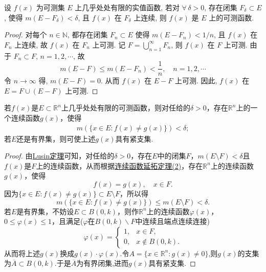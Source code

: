 \documentclass[../../main.tex]{subfiles}
\begin{document}
\begin{theorem}\label{theorem:Lusin定理的逆定理}
设 \( f(x) \) 为可测集 \( E \) 上几乎处处有限的实值函数, 若对 \( \forall\,\delta > 0 \), 存在闭集 \( F_{\delta} \subset E \), 使得 \( m(E - F_{\delta}) < \delta \), 且 \( f(x) \) 在 \( F_{\delta} \) 上连续, 则 \( f(x) \) 是 \( E \) 上的可测函数.
\end{theorem}
\begin{proof}
对每个 \( n \in \mathbb{N} \), 都存在闭集 \( F_{n} \subset E \) 使得 \( m(E - F_{n}) < 1/n \), 且 \( f(x) \) 在 \( F_{n} \) 上连续, 故 \( f(x) \) 在 \( F_{n} \) 上可测.
记 \( F = \bigcup_{n = 1}^{\infty} F_{n} \), 则 \( f(x) \) 在 \( F \) 上可测. 由于 \( F_{n} \subset F \), \( n = 1, 2, \cdots \), 故
\[
m(E - F) \leqslant m(E - F_{n}) < \frac{1}{n}, \quad n = 1, 2, \cdots
\]
令 \( n \to \infty \) 得, \( m(E - F) = 0 \). 从而 \( f(x) \) 在 \( E - F \) 上可测. 因此, \( f(x) \) 在 \( E = F \cup (E - F) \) 上可测.

\end{proof}

\begin{corollary}\label{corollary:推论3.19}
若\(f(x)\)是\(E \subset \mathbb{R}^{n}\)上几乎处处有限的可测函数，则对任给的\(\delta > 0\)，存在\(\mathbb{R}^{n}\)上的一个连续函数\(g(x)\)，使得
\begin{align*}
m(\{x \in E: f(x) \neq g(x)\}) < \delta; 
\end{align*}
若\(E\)还是有界集，则可使上述\(g(x)\)具有紧支集.
\end{corollary}
\begin{proof}
由\hyperref[theorem:Lusin(卢津)定理]{Lusin定理}可知，对任给的\(\delta > 0\)，存在\(E\)中的闭集\(F\)，\(m(E \setminus F) < \delta\)且\(f(x)\)是\(F\)上的连续函数，从而根据\hyperref[theorem:连续函数延拓定理]{连续函数延拓定理(2)}，存在\(\mathbb{R}^{n}\)上的连续函数\(g(x)\)，使得
\[f(x) = g(x), \quad x \in F.\]
因为\(\{x \in E: f(x) \neq g(x)\} \subset E \setminus F\)，所以得
\[m(\{x \in E: f(x) \neq g(x)\}) \leqslant m(E \setminus F) < \delta.\]
若\(E\)是有界集，不妨设\(E \subset B(0, k)\)，则作\(\mathbb{R}^{n}\)上的连续函数\(\varphi(x)\)，\(0 \leqslant \varphi(x) \leqslant 1\)，且满足($\varphi$在$B(0,k)\backslash F$中连续且端点连续连接)
\[\varphi(x) = 
\begin{cases}
1, & x \in F, \\
0, & x \notin B(0, k).
\end{cases}\]
从而将上述\(g(x)\)换成\(g(x) \cdot \varphi(x)\).令$A=\{x\in \mathbb{R}^n:g(x)\ne 0\}$,则$g(x)$的支集为$\overline{A}\subset B(0,k)$.于是$\overline{A}$为有界闭集,进而$g(x)$具有紧支集.

\end{proof}
\end{document}
